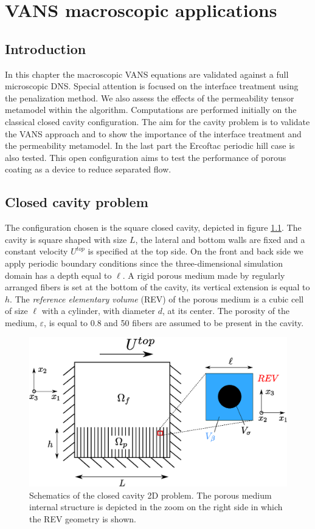 \chapter{VANS macroscopic applications}


\section{Introduction}

In this chapter the macroscopic VANS equations are validated against a full microscopic DNS. Special attention is focused on the interface treatment using the penalization method. We also assess the effects of the permeability tensor metamodel within the algorithm. Computations are performed initially on the classical closed cavity configuration. The aim for the cavity problem is to validate the VANS approach and to show the importance of the interface treatment and the permeability metamodel. In the last part the Ercoftac periodic hill case is also tested. This open configuration aims to test the performance of porous coating as a device to reduce separated flow.


\section{Closed cavity problem}
The configuration chosen is the square closed cavity, depicted in figure \ref{fig:geom}.
The cavity is square shaped with size $L$, the lateral and bottom walls are fixed and a constant velocity $U^{top}$ is specified at the top side.
On the front and back side we apply periodic boundary conditions since the 	three-dimensional simulation domain has a depth equal to $\ell$.
A rigid porous medium made by regularly arranged fibers is set at the bottom of the cavity, its vertical extension is equal to $h$.
The \textit{reference elementary volume} (REV) of the porous medium is a cubic cell of size $\ell$ with a cylinder, with diameter $d$, at its center.
The porosity of the medium, $\varepsilon$, is equal to 0.8 and 50 fibers are assumed to be present in the cavity.

\begin{figure}[h]
\centering
\includegraphics[width=0.7\linewidth]{chapter_5/figure/cavity_draw.eps}
\caption{Schematics of the closed cavity 2D problem. The porous medium internal structure is depicted in the zoom on the right side in which the REV geometry is shown.}
\label{fig:geom}
\end{figure}

